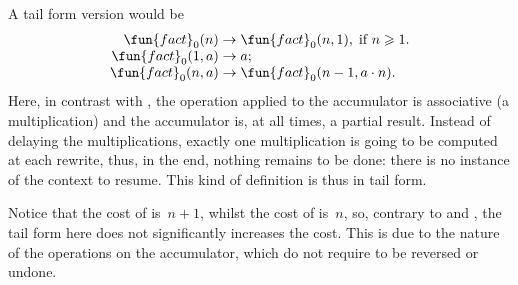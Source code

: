 A tail form version
 would be
\begin{equation*}
\begin{array}{r@{\;}c@{\;}l}
\fun{fact}_0(n) & \rightarrow & \fun{fact}_0(n,1),
\;\text{if \(n \geqslant 1\)}.\\
\fun{fact}_0(1,a) & \rightarrow & a;\\
\fun{fact}_0(n,a) & \rightarrow & \fun{fact}_0(n-1,a \cdot n).
\end{array}
\end{equation*}
Here, in contrast with , the operation applied to the
accumulator is associative (a multiplication) and the accumulator is,
at all times, a partial result. Instead of delaying the
multiplications, exactly one multiplication is going to be computed at
each rewrite, thus, in the end, nothing remains to be done: there is
no instance of the context to resume. This kind of definition is thus
in tail form.

Notice that the cost of  is~\(n+1\), whilst the cost
of  is~\(n\), so, contrary to  and
, the tail form here does not significantly increases the
cost. This is due to the nature of the operations on the accumulator,
which do not require to be reversed or undone.

